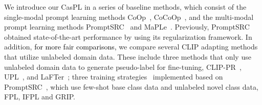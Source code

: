 \documentclass[runningheads]{llncs}
\newcommand{\important}[1]{\textcolor{black}{#1}}
\begin{document}
{{
We introduce our CasPL in a series of baseline methods, which consist of the single-modal prompt learning methods CoOp~\cite{zhou2022learning}, CoCoOp~\cite{zhou2022conditional}, and the multi-modal prompt learning methods PromptSRC~\cite{khattak2023self} and MaPLe~\cite{khattak2023maple}. Previously, PromptSRC obtained state-of-the-art performance by using its regularization framework. In addition, \important{for more fair comparisons,} we compare several CLIP adapting methods that utilize unlabeled domain data. These include three methods that only use unlabeled domain data to generate pseudo-label for fine-tuning, CLIP-PR~\cite{kahana2022improving}, UPL~\cite{huang2022unsupervised}, and LaFTer~\cite{mirza2023lafter}; three training strategies~\cite{menghini2023enhancing} implemented based on PromptSRC~\cite{khattak2023self}, which use few-shot base class data and unlabeled novel class data, FPL, IFPL and GRIP.


}}
\end{document}
